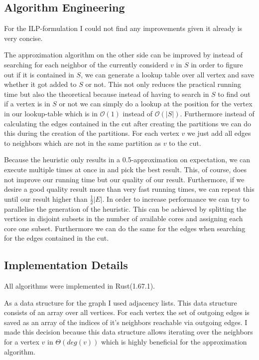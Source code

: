 \documentclass[twocolumn]{article}
\begin{document}
\subsection{Algorithm Engineering}
For the ILP-formulation I could not find any improvements given it already is very concise.

The approximation algorithm on the other side can be improved by instead of searching for each neighbor of the currently considerd $v$ in $S$
in order to figure out if it is contained in $S$, we can generate a lookup table over all vertex and save whether it got added to $S$ or not.
This not only reduces the practical running time but also the theoretical because instead of having to search in $S$ to find out if a vertex is
in $S$ or not we can simply do a lookup at the position for the vertex in our lookup-table which is in $\mathcal{O}(1)$ instead of $\mathcal{O}(|S|)$.
Furthermore instead of calculating the edges contained in the cut after creating the partitions we can do this during the creation of the partitions.
For each vertex $v$ we just add all edges to neighbors which are not in the same partition as $v$ to the cut.

Because the heuristic only results in a 0.5-approximation on expectation,
we can execute multiple times at once in and pick the best result.
This, of course, does not improve our running time but our quality of our result.
Furthermore, if we desire a good quality result more than very fast running times,
we can repeat this until our result higher than $\frac{1}{2}|E|$.
In order to increase performance we can try to parallelise the generation of the heuristic.
This can be achieved by splitting the vertices in disjoint subsets in the number of available cores
and assigning each core one subset.
Furthermore we can do the same for the edges when searching for the edges contained in the cut.


\subsection{Implementation Details}

All algorithms were implemented in Rust(1.67.1).

As a data structure for the graph I used adjacency lists. This data structure consists of an array over all vertices. 
For each vertex the set of outgoing edges is saved as an array of the indices of it's neighbors reachable via outgoing edges.
I made this decision because this data structure allows iterating over the neighbors for
a vertex $v$ in $\Theta(deg(v))$ which is highly beneficial for the approximation algorithm.
\end{document}
